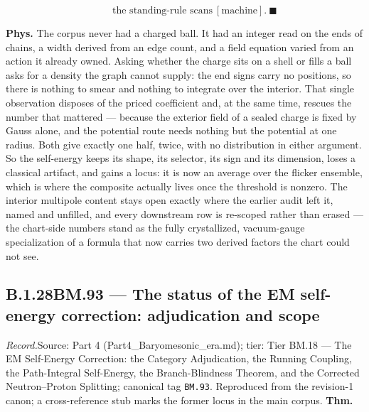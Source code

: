 \documentclass[11pt,openany]{report}
\theoremstyle{canonplain}
\theoremstyle{canondef}
\begin{document}
\[
\qquad \text{the standing-rule scans}\ [\text{machine}].\ \blacksquare
\]

\textbf{Phys.} The corpus never had a charged ball. It had an integer read on the ends of chains, a width derived from an edge count, and a field equation varied from an action it already owned. Asking whether the charge sits on a shell or fills a ball asks for a density the graph cannot supply: the end signs carry no positions, so there is nothing to smear and nothing to integrate over the interior. That single observation disposes of the priced coefficient and, at the same time, rescues the number that mattered — because the exterior field of a sealed charge is fixed by Gauss alone, and the potential route needs nothing but the potential at one radius. Both give exactly one half, twice, with no distribution in either argument. So the self-energy keeps its shape, its selector, its sign and its dimension, loses a classical artifact, and gains a locus: it is now an average over the flicker ensemble, which is where the composite actually lives once the threshold is nonzero. The interior multipole content stays open exactly where the earlier audit left it, named and unfilled, and every downstream row is re-scoped rather than erased — the chart-side numbers stand as the fully crystallized, vacuum-gauge specialization of a formula that now carries two derived factors the chart could not see.

\medskip
\subsection*{\texorpdfstring{B.1.28\quad BM.93 — The status of the EM self-energy correction: adjudication and scope}{BM.93 B.1.28}}
\label{tag:BM-93}
{\small \textit{Record.}\quad Source: Part 4 (Part4\_Baryomesonic\_era.md); tier: Tier BM.18 — The EM Self-Energy Correction: the Category Adjudication, the Running Coupling, the Path-Integral Self-Energy, the Branch-Blindness Theorem, and the Corrected Neutron–Proton Splitting; canonical tag \texttt{BM.93}. Reproduced from the revision-1 canon; a cross-reference stub marks the former locus in the main corpus.}
\medskip
\textbf{Thm.}
\end{document}

